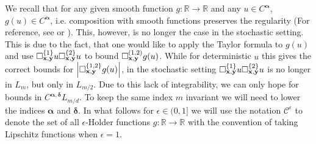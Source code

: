 \documentclass[12pt]{article}
\numberwithin{equation}{section}
\theoremstyle{plain}
\theoremstyle{definition}
\newcommand{\abs}[1]{\left\vert #1 \right\vert}
\def\bR{\mathbb{R}}\def\bS{\mathbb{S}}
\def\fy{\mathbf y}\def\fz{\mathbf z}
\def\falpha{{\boldsymbol\alpha}}
\def\fbeta{{\boldsymbol\beta}}
\def\fdelta{{\boldsymbol\delta}}
\begin{document}
We recall that for any  given smooth function $g\colon \mathbb R\to \mathbb R$ and any  $u\in C^{\falpha}$, $g(u)\in C^\falpha$, i.e. composition with smooth functions preserves the regularity (For reference, see \cite[Lemma 3.1]{tindel07} or \cite[Lemma 15]{bechtold2022}). This, however, is no longer the case in the stochastic setting.  This is due to the fact, that one would like to apply the Taylor formula to $g(u)$ and use  $\square^{\{1\}}_{\fx,\fy}u \square^{\{2\}}_{\fx,\fy} u$ to bound $\square^{(1,2)}_{\fx,\fy} g(u)$. While for deterministic $u$ this gives the correct bounds for $\abs{\square^{\{1,2\}}_{\fx,\fy}g(u)}$, in the stochastic setting $\square^{\{1\}}_{\fx,\fy}u \square^{\{2\}}_{\fx,\fy} u$ is no longer in $L_m$, but only in $L_{m/2}$. Due to this lack of integrability, we can only hope for bounds in $C^{\falpha,\fdelta}L_{m/d}$. To keep the same index $m $ invariant we will need to lower  the indices $\falpha$ and $\fdelta$. In what follows for $\epsilon\in(0,1]$ we will use the notation $\mathcal{C}^\epsilon$ to denote the set of all $\epsilon$-Holder functions $g\colon \mathbb R\to \mathbb R$ with the convention of taking Lipschitz functions when $\epsilon=1$.

\end{document}
